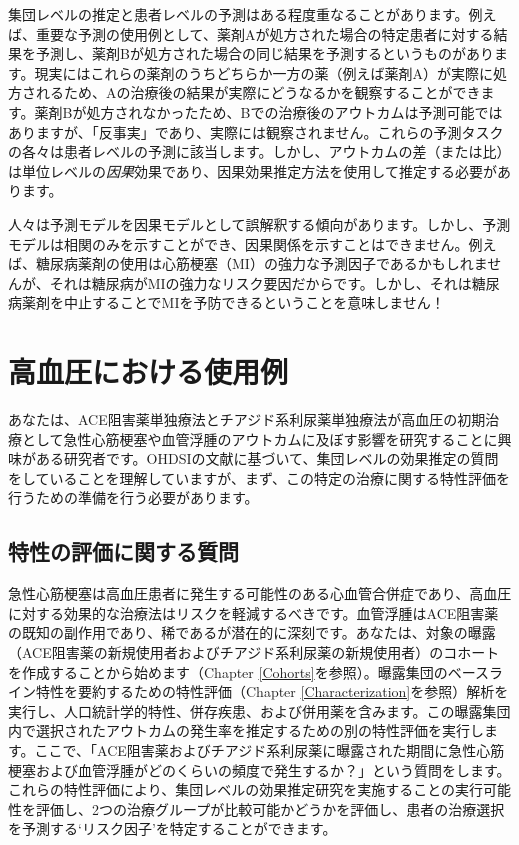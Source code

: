 \documentclass[
  11pt]{book}
\makeatletter
\newenvironment{kframe}{%
\medskip{}
\setlength{\fboxsep}{.8em}
 \def\at@end@of@kframe{}%
 \ifinner\ifhmode%
  \def\at@end@of@kframe{\end{minipage}}%
  \begin{minipage}{\columnwidth}%
 \fi\fi%
 \def\FrameCommand##1{\hskip\@totalleftmargin \hskip-\fboxsep
 \colorbox{myShadeColor}{##1}\hskip-\fboxsep
     \hskip-\linewidth \hskip-\@totalleftmargin \hskip\columnwidth}%
 \MakeFramed {\advance\hsize-\width
   \@totalleftmargin\z@ \linewidth\hsize
   \@setminipage}}%
 {\par\unskip\endMakeFramed%
 \at@end@of@kframe}
\newenvironment{rmdblock}[1]
  {
  \begin{itemize}
  \renewcommand{\labelitemi}{
    \raisebox{-.7\height}[0pt][0pt]{
      {\setkeys{Gin}{width=3em,keepaspectratio}\texttt{[image: images/\#1]}}
    }
  }
  \setlength{\fboxsep}{1em}
  \begin{kframe}
  \item
  }
  {
  \end{kframe}
  \end{itemize}
  }
\newenvironment{rmdimportant}
  {\begin{rmdblock}{important}}
  {\end{rmdblock}}
\theoremstyle{definition}
\theoremstyle{definition}
\theoremstyle{definition}
\theoremstyle{definition}
\theoremstyle{remark}
\makeatother
\begin{document}
集団レベルの推定と患者レベルの予測はある程度重なることがあります。例えば、重要な予測の使用例として、薬剤Aが処方された場合の特定患者に対する結果を予測し、薬剤Bが処方された場合の同じ結果を予測するというものがあります。現実にはこれらの薬剤のうちどちらか一方の薬（例えば薬剤A）が実際に処方されるため、Aの治療後の結果が実際にどうなるかを観察することができます。薬剤Bが処方されなかったため、Bでの治療後のアウトカムは予測可能ではありますが、「反事実」であり、実際には観察されません。これらの予測タスクの各々は患者レベルの予測に該当します。しかし、アウトカムの差（または比）は単位レベルの\emph{因果}効果であり、因果効果推定方法を使用して推定する必要があります。

\begin{rmdimportant}
人々は予測モデルを因果モデルとして誤解釈する傾向があります。しかし、予測モデルは相関のみを示すことができ、因果関係を示すことはできません。例えば、糖尿病薬剤の使用は心筋梗塞（MI）の強力な予測因子であるかもしれませんが、それは糖尿病がMIの強力なリスク要因だからです。しかし、それは糖尿病薬剤を中止することでMIを予防できるということを意味しません！
\end{rmdimportant}

\section{高血圧における使用例}\label{ux9ad8ux8840ux5727ux306bux304aux3051ux308bux4f7fux7528ux4f8b}

あなたは、ACE阻害薬単独療法とチアジド系利尿薬単独療法が高血圧の初期治療として急性心筋梗塞や血管浮腫のアウトカムに及ぼす影響を研究することに興味がある研究者です。OHDSIの文献に基づいて、集団レベルの効果推定の質問をしていることを理解していますが、まず、この特定の治療に関する特性評価を行うための準備を行う必要があります。

\subsection{特性の評価に関する質問}\label{ux7279ux6027ux306eux8a55ux4fa1ux306bux95a2ux3059ux308bux8ceaux554f}

急性心筋梗塞は高血圧患者に発生する可能性のある心血管合併症であり、高血圧に対する効果的な治療法はリスクを軽減するべきです。血管浮腫はACE阻害薬の既知の副作用であり、稀であるが潜在的に深刻です。あなたは、対象の曝露（ACE阻害薬の新規使用者およびチアジド系利尿薬の新規使用者）のコホートを作成することから始めます（Chapter \ref{Cohorts}を参照）。曝露集団のベースライン特性を要約するための特性評価（Chapter \ref{Characterization}を参照）解析を実行し、人口統計学的特性、併存疾患、および併用薬を含みます。この曝露集団内で選択されたアウトカムの発生率を推定するための別の特性評価を実行します。ここで、「ACE阻害薬およびチアジド系利尿薬に曝露された期間に急性心筋梗塞および血管浮腫がどのくらいの頻度で発生するか？」という質問をします。これらの特性評価により、集団レベルの効果推定研究を実施することの実行可能性を評価し、2つの治療グループが比較可能かどうかを評価し、患者の治療選択を予測する`リスク因子'を特定することができます。
\end{document}
